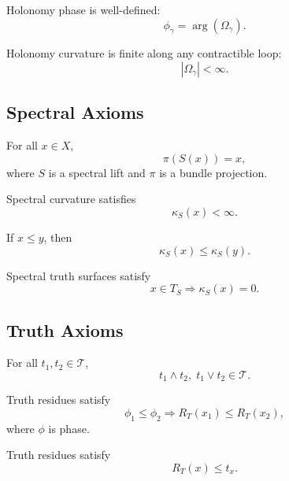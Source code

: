 \begin{axiom}
Holonomy phase is well-defined:
\[
\phi_\gamma = \arg(\Omega_\gamma).
\]
\end{axiom}

\begin{axiom}
Holonomy curvature is finite along any contractible loop:
\[
|\Omega_\gamma| < \infty.
\]
\end{axiom}


\subsection{Spectral Axioms}

\begin{axiom}
For all $x \in X$,
\[
\pi(S(x)) = x,
\]
where $S$ is a spectral lift and $\pi$ is a bundle projection.
\end{axiom}

\begin{axiom}
Spectral curvature satisfies
\[
\kappa_S(x) < \infty.
\]
\end{axiom}

\begin{axiom}
If $x \le y$, then
\[
\kappa_S(x) \le \kappa_S(y).
\]
\end{axiom}

\begin{axiom}
Spectral truth surfaces satisfy
\[
x \in T_S \Rightarrow \kappa_S(x) = 0.
\]
\end{axiom}


\subsection{Truth Axioms}

\begin{axiom}
For all $t_1,t_2 \in \mathcal{T}$,
\[
t_1 \wedge t_2, \; t_1 \vee t_2 \in \mathcal{T}.
\]
\end{axiom}

\begin{axiom}
Truth residues satisfy
\[
\phi_1 \le \phi_2 \Rightarrow R_T(x_1) \le R_T(x_2),
\]
where $\phi$ is phase.
\end{axiom}

\begin{axiom}
Truth residues satisfy
\[
R_T(x) \le t_x.
\]
\end{axiom}


